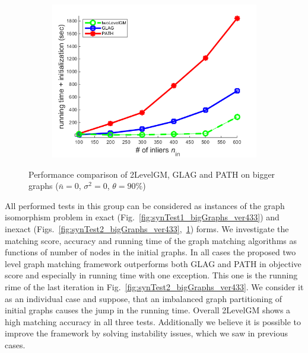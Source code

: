 \begin{figure}[h]
\begin{subfigure}[b]{0.32\textwidth}
			\includegraphics[scale=0.33]{"chapter3/fig/SyntheticTest_BigGraphs/descr/Results_v4.3.3/Test3/time_summary_avg1t"} 
		\end{subfigure} 	
	\caption[Performance comparison of 2LevelGM, GLAG and PATH on bigger graphs: test $3$]{Performance comparison of 2LevelGM, GLAG and PATH on bigger graphs ($\bar{n}=0$, $\sigma^2=0$, $\theta=90\%$)}
	\label{fig:synTest3_bigGraphs_ver433}
\end{figure}

All performed tests in this group can be considered as instances of the graph isomorphism problem in exact (Fig.~\ref{fig:synTest1_bigGraphs_ver433}) and inexact (Figs.~\ref{fig:synTest2_bigGraphs_ver433},~\ref{fig:synTest3_bigGraphs_ver433}) forms. We investigate the matching score, accuracy and running time of the graph matching algorithms as functions of number of nodes in the initial graphs.
In all cases the proposed two level graph matching framework outperforms both GLAG and PATH in objective score and especially in running time with one exception. This one is the running rime of the last iteration in Fig.~\ref{fig:synTest2_bigGraphs_ver433}. We consider it as an individual case and suppose, that an imbalanced graph partitioning of initial graphs causes the jump in the running time. Overall 2LevelGM shows a high matching accuracy in all three tests. Additionally we believe it is possible to improve the framework by solving instability issues, which we saw in previous cases. 
\FloatBarrier
